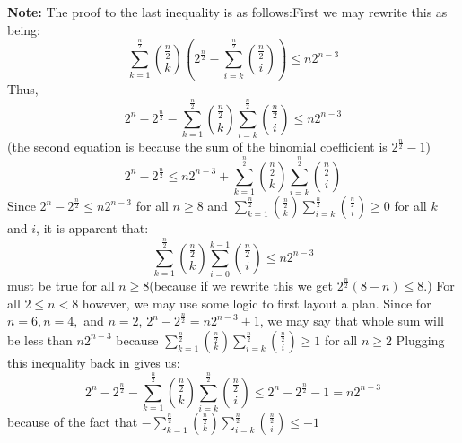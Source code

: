 \begin{enumerate}
 \textbf{Note:} The proof to the last inequality is as follows:First we may rewrite this as being:
 \[\sum_{k=1}^{\frac{n}{2}} \binom{\frac{n}{2}}{k} \left( 2^{\frac{n}{2}} - \sum_{i=k}^{\frac{n}{2}} \binom{\frac{n}{2}}{i}\right)  \le n2^{n-3}\]Thus,
 \[2^n - 2^{\frac{n}{2}} - \sum_{k=1}^{\frac{n}{2}} \binom{\frac{n}{2}}{k} \sum_{i=k}^{\frac{n}{2}} \binom{\frac{n}{2}}{i} \le n2^{n-3}\](the second equation is because the sum of the binomial coefficient is $2^{\frac{n}{2}} - 1$)
 \[2^n - 2^{\frac{n}{2}} \le n2^{n-3} + \sum_{k=1}^{\frac{n}{2}} \binom{\frac{n}{2}}{k} \sum_{i=k}^{\frac{n}{2}} \binom{\frac{n}{2}}{i}\]Since $2^n - 2^{\frac{n}{2}} \le n2^{n-3}$ for all $n \ge 8$ and $\sum_{k=1}^{\frac{n}{2}} \binom{\frac{n}{2}}{k} \sum_{i=k}^{\frac{n}{2}} \binom{\frac{n}{2}}{i} \ge 0$ for all $k$ and $i$, it is apparent that:
 \[\sum_{k=1}^{\frac{n}{2}} \binom{\frac{n}{2}}{k} \sum_{i=0}^{k-1} \binom{\frac{n}{2}}{i} \le n2^{n-3}\]must be true for all $n \ge 8$(because if we rewrite this we get $2^{\frac{n}{2}}\left(8-n\right) \le 8$.) For all $2 \le n < 8$ however, we may use some logic to first layout a plan. Since for $n=6,n=4,$ and $n=2$, $2^{n} - 2^{\frac{n}{2}} = n2^{n-3} + 1$, we may say that whole sum will be less than $n2^{n-3}$ because $\sum_{k=1}^{\frac{n}{2}} \binom{\frac{n}{2}}{k} \sum_{i=k}^{\frac{n}{2}} \binom{\frac{n}{2}}{i} \ge 1$ for all $n \ge 2$ Plugging this inequality back in gives us:
 \[2^{n} - 2^{\frac{n}{2}} - \sum_{k=1}^{\frac{n}{2}} \binom{\frac{n}{2}}{k} \sum_{i=k}^{\frac{n}{2}} \binom{\frac{n}{2}}{i} \le 2^{n} - 2^{\frac{n}{2}} - 1 = n2^{n-3}\] because of the fact that $- \sum_{k=1}^{\frac{n}{2}} \binom{\frac{n}{2}}{k} \sum_{i=k}^{\frac{n}{2}} \binom{\frac{n}{2}}{i} \le -1$



\end{enumerate}